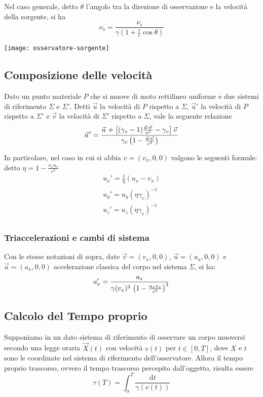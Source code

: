 \documentclass[10pt,a4paper]{article}
\newcommand{\de}{{\ensuremath{ \mbox{d}}}}
\begin{document}
\begin{multicols}{2}
  Nel caso generale, detto $\theta$ l'angolo tra la direzione di osservazione e la velocità della sorgente, si ha
  $$ \nu_o = \frac{\nu_s}{\gamma (1 + \frac{v}{c} \cos\theta)} $$

  \begin{center}
    \texttt{[image: osservatore-sorgente]}
  \end{center}

  \subsection*{Composizione delle velocità}
  Dato un punto materiale $P$ che si muove di moto rettilineo uniforme e due sistemi di riferimento $\Sigma$ e $\Sigma'$. Detti $\vec u$ la velocità di $P$ rispetto a $\Sigma$, $\vec u'$ la velocità di $P$ rispetto a $\Sigma'$ e $\vec v$ la velocità di $\Sigma'$ rispetto a $\Sigma$, vale la seguente relazione
  $$ \vec u' = \frac{\vec u + \lrq{(\gamma_v - 1) \frac{\vec u \dotp \vec v}{v^2} - \gamma_v} \vec v}{\gamma_v \lrt{1 - \frac{\vec u \dotp \vec v}{c^2}}} $$

  In particolare, nel caso in cui si abbia $v = (v_x, 0, 0)$ valgono le seguenti formule: detto $\eta = 1 - \frac{v_x u_x}{c^2}$
  \begin{displaymath}
    \begin{array}{c}
      u_x' = \frac{1}{\eta} (u_x - v_x) \\
      u_y' = u_y (\eta \gamma_v)^{-1} \\
      u_z' = u_z (\eta \gamma_v)^{-1} \\
    \end{array}
  \end{displaymath}

  \subsubsection*{Triaccelerazioni e cambi di sistema}
  Con le stesse notazioni di sopra, date $\vec v = (v_x, 0, 0)$, $\vec u = (u_x, 0, 0)$ e $\vec a = (a_x, 0, 0)$ accelerazione classica del corpo nel sistema $\Sigma$, si ha:
  $$ a_x' = \frac{a_x}{\gamma(v_x)^3 \, \left({1 - \frac{u_x v_x}{c^2}}\right)^3} $$
  
  \subsection*{Calcolo del Tempo proprio}
  Supponiamo in un dato sistema di riferimento di osservare un corpo muoversi secondo una legge oraria $\vec X(t)$ con velocità $v(t)$ per $t \in [0, T]$, dove $X$ e $t$ sono le coordinate nel sistema di riferimento dell'osservatore. Allora il tempo proprio trascorso, ovvero il tempo trascorso percepito dall'oggetto, risulta essere
  $$ \tau (T) = \int_0^T \frac{\de t}{\gamma(v(t))} $$


\end{multicols}
\end{document}
